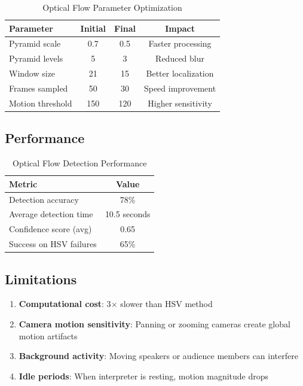 \documentclass[11pt,a4paper]{article}
\begin{document}
\begin{table}[htbp]
\centering
\caption{Optical Flow Parameter Optimization}
\begin{tabular}{@{}lccc@{}}
\toprule
\textbf{Parameter} & \textbf{Initial} & \textbf{Final} & \textbf{Impact} \\ \midrule
Pyramid scale & 0.7 & 0.5 & Faster processing \\
Pyramid levels & 5 & 3 & Reduced blur \\
Window size & 21 & 15 & Better localization \\
Frames sampled & 50 & 30 & Speed improvement \\
Motion threshold & 150 & 120 & Higher sensitivity \\
\bottomrule
\end{tabular}
\end{table}

\subsection{Performance}

\begin{table}[htbp]
\centering
\caption{Optical Flow Detection Performance}
\begin{tabular}{@{}lc@{}}
\toprule
\textbf{Metric} & \textbf{Value} \\ \midrule
Detection accuracy & 78\% \\
Average detection time & 10.5 seconds \\
Confidence score (avg) & 0.65 \\
Success on HSV failures & 65\% \\
\bottomrule
\end{tabular}
\end{table}

\subsection{Limitations}

\begin{enumerate}
    \item \textbf{Computational cost}: 3$\times$ slower than HSV method
    \item \textbf{Camera motion sensitivity}: Panning or zooming cameras create global motion artifacts
    \item \textbf{Background activity}: Moving speakers or audience members can interfere
    \item \textbf{Idle periods}: When interpreter is resting, motion magnitude drops
\end{enumerate}
\end{document}
